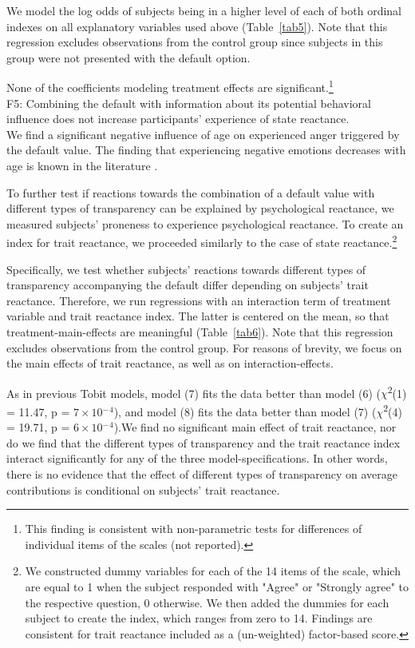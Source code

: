 \documentclass[review, authoryear,12pt]{elsarticle}
\begin{document}
We model the log odds of subjects being in a higher level of each of both ordinal indexes on all explanatory variables used above (Table~\ref{tab5}). Note that this regression excludes observations from the control group since subjects in this group were not presented with the default option.

None of the coefficients modeling treatment effects are significant.\footnote{This finding is consistent with non-parametric tests for differences of individual items of the scales (not reported).} \\

F5: Combining the default with information about its potential behavioral influence does not increase participants' experience of state reactance. \\

We find a significant negative influence of age on experienced anger triggered by the default value. The finding that experiencing negative emotions decreases with age is known in the literature \citep[e.g.][]{Charles.2001}.

To further test if reactions towards the combination of a default value with different types of transparency can be explained by psychological reactance, we measured subjects' proneness to experience psychological reactance. To create an index for trait reactance, we proceeded similarly to the case of state reactance.\footnote{We constructed dummy variables for each of the 14 items of the scale, which are equal to 1 when the subject responded with "Agree" or "Strongly agree" to the respective question, 0 otherwise. We then added the dummies for each subject to create the index, which ranges from zero to 14. Findings are consistent for trait reactance included as a (un-weighted) factor-based score.}

Specifically, we test whether subjects' reactions towards different types of transparency accompanying the default differ depending on subjects' trait reactance. Therefore, we run regressions with an interaction term of treatment variable and trait reactance index. The latter is centered on the mean, so that treatment-main-effects are meaningful (Table~\ref{tab6}). Note that this regression excludes observations from the control group. For reasons of brevity, we focus on the main effects of trait reactance, as well as on interaction-effects.

As in previous Tobit models, model (7) fits the data better than model (6) ($\chi$\textsuperscript{2}(1) = 11.47, p = $7\times 10$$^-$$^4$), and model (8) fits the data better than model (7) ($\chi$\textsuperscript{2}(4) = 19.71, p = $6\times 10$$^-$$^4$).We find no significant main effect of trait reactance, nor do we find that the different types of transparency and the trait reactance index interact significantly for any of the three model-specifications. In other words, there is no evidence that the effect of different types of transparency on average contributions is conditional on subjects' trait reactance. \\
\end{document}
